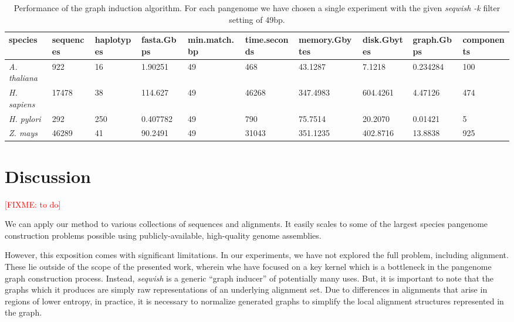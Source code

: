 \documentclass{bioinfo}
\theoremstyle{definition}
\newcommand{\red}[1]{{\textcolor{Red}{#1}}}
\newcommand{\FIXME}[1]{\red{[FIXME: #1]}}
\begin{document}
\begin{table*}[!ht]
    \centering
    \caption{Performance of the graph induction algorithm.
        For each pangenome we have chosen a single experiment with the given \textit{seqwish -k} filter setting of 49bp.
        }
    \begin{tabular}{|l|l|l|l|l|l|l|l|l|l|}
        \hline
        species & sequences & haplotypes & fasta.Gbps & min.match.bp & time.seconds & memory.Gbytes & disk.Gbytes & graph.Gbps & components \\ \hline
        \textit{A. thaliana} & 922 & 16 & 1.90251 & 49 & 468 & 43.1287 & 7.1218 & 0.234284 & 100 \\ \hline
        \textit{H. sapiens} & 17478 & 38 & 114.627 & 49 & 46268 & 347.4983 & 604.4261 & 4.47126 & 474 \\ \hline
        \textit{H. pylori} & 292 & 250 & 0.407782 & 49 & 790 & 75.7514 & 20.2070 & 0.01421 & 5 \\ \hline
        \textit{Z. mays} & 46289 & 41 & 90.2491 & 49 & 31043 & 351.1235 & 402.8716 & 13.8838 & 925 \\ \hline
    \end{tabular}
\end{table*}





\section{Discussion}
\label{sec:discussion}
\FIXME{to do}

We can apply our method to various collections of sequences and alignments.
It easily scales to some of the largest species pangenome construction problems possible using publicly-available, high-quality genome assemblies.

However, this exposition comes with significant limitations.
In our experiments, we have not explored the full problem, including alignment.
These lie outside of the scope of the presented work, wherein whe have focused on a key kernel which is a bottleneck in the pangenome graph construction process.
Instead, \textit{seqwish} is a generic ``graph inducer'' of potentially many uses.
But, it is important to note that the graphs which it produces are simply raw representations of an underlying alignment set.
Due to differences in alignments that arise in regions of lower entropy, in practice, it is necessary to normalize generated graphs to simplify the local alignment structures represented in the graph.
\end{document}
